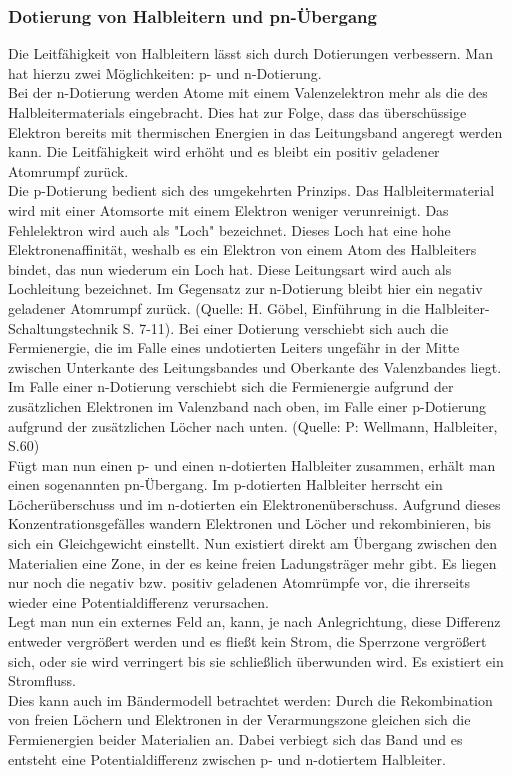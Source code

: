\subsubsection{Dotierung von Halbleitern und pn-Übergang}
Die Leitfähigkeit von Halbleitern lässt sich durch Dotierungen verbessern. Man hat hierzu zwei Möglichkeiten: p- und n-Dotierung. \\
Bei der n-Dotierung werden Atome mit einem Valenzelektron mehr als die des Halbleitermaterials eingebracht. Dies hat zur Folge, dass das überschüssige Elektron bereits mit thermischen Energien in das Leitungsband angeregt werden kann. Die Leitfähigkeit wird erhöht und es bleibt ein positiv geladener Atomrumpf zurück.\\
Die p-Dotierung bedient sich des umgekehrten Prinzips. Das Halbleitermaterial wird mit einer Atomsorte mit einem Elektron weniger verunreinigt. Das Fehlelektron wird auch als "Loch" bezeichnet. Dieses Loch hat eine hohe Elektronenaffinität, weshalb es ein Elektron von einem Atom des Halbleiters bindet, das nun wiederum ein Loch hat. Diese Leitungsart wird auch als Lochleitung bezeichnet. Im Gegensatz zur n-Dotierung bleibt hier ein negativ geladener Atomrumpf zurück. (Quelle: H. Göbel, Einführung in die Halbleiter-Schaltungstechnik S. 7-11). Bei einer Dotierung verschiebt sich auch die Fermienergie, die im Falle eines undotierten Leiters ungefähr in der Mitte zwischen Unterkante des Leitungsbandes und Oberkante des Valenzbandes liegt. Im Falle einer n-Dotierung verschiebt sich die Fermienergie aufgrund der zusätzlichen Elektronen im Valenzband nach oben, im Falle einer p-Dotierung aufgrund der zusätzlichen Löcher nach unten. (Quelle: P: Wellmann, Halbleiter, S.60)\\
Fügt man nun einen p- und einen n-dotierten Halbleiter zusammen, erhält man einen sogenannten pn-Übergang. Im p-dotierten Halbleiter herrscht ein Löcherüberschuss und im n-dotierten ein Elektronenüberschuss. Aufgrund dieses Konzentrationsgefälles wandern Elektronen und Löcher und rekombinieren, bis sich ein Gleichgewicht einstellt. Nun existiert direkt am Übergang zwischen den Materialien eine Zone, in der es keine freien Ladungsträger mehr gibt. Es liegen nur noch die negativ bzw. positiv geladenen Atomrümpfe vor, die ihrerseits wieder eine Potentialdifferenz verursachen.\\
Legt man nun ein externes Feld an, kann, je nach Anlegrichtung, diese Differenz entweder vergrößert werden und es fließt kein Strom, die Sperrzone vergrößert sich, oder sie wird verringert bis sie schließlich überwunden wird. Es existiert ein Stromfluss. \\
Dies kann auch im Bändermodell betrachtet werden: Durch die Rekombination von freien Löchern und Elektronen in der Verarmungszone gleichen sich die Fermienergien beider Materialien an. Dabei verbiegt sich das Band und es entsteht eine Potentialdifferenz zwischen p- und n-dotiertem Halbleiter. 

